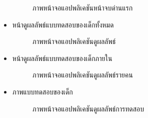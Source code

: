 \documentclass[12pt,oneside,openright,a4paper]{cpe-thai-project}
\begin{document}
\begin{itemize}
\begin{figure}[!h]
    \caption{ภาพหน้าจอแอปพลิเคชันหน้าจบด่านแรก}\label{fig:system}
  \end{figure}
 \item หน้าดูผลลัพธ์แบบทดสอบของเด็กทั้งหมด 
  \begin{figure}[!h]\centering
    \setlength{\fboxrule}{0.2mm} %
    \setlength{\fboxsep}{1cm}
    \caption{ภาพหน้าจอแอปพลิเคชันดูผลลัพธ์}\label{fig:system}
  \end{figure}
  \newpage
 \item หน้าดูผลลัพธ์แบบทดสอบของเด็กภายใน
  \begin{figure}[!h]\centering
    \setlength{\fboxrule}{0.2mm} %
    \setlength{\fboxsep}{1cm}
    \caption{ภาพหน้าจอแอปพลิเคชันดูผลลัพธ์รายคน}\label{fig:system}
  \end{figure}
 \item ภาพแบบทดสอบของเด็ก
  \begin{figure}[!h]\centering
    \setlength{\fboxrule}{0.2mm} %
    \setlength{\fboxsep}{1cm}
    \caption{ภาพหน้าจอแอปพลิเคชันดูผลลัพธ์การทดสอบ}\label{fig:system}                  
   \end{figure}
\end{itemize}
\newpage
\end{document}
